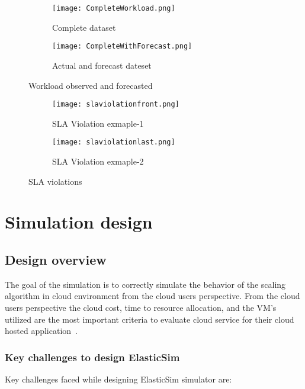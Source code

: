 \begin{figure}
     \centering
     \begin{subfigure}[b]{0.7\textwidth}
         \texttt{[image: CompleteWorkload.png]}
         \caption{Complete dataset}
         \label{figure:sampleworkload}
     \end{subfigure}
     \begin{subfigure}[b]{0.7\textwidth}
         \texttt{[image: CompleteWithForecast.png]}
         \caption{Actual and forecast dateset}
         \label{figure:forecasted}
     \end{subfigure}
     \caption{Workload observed and forecasted}
     \label{fig:workloads}
 \end{figure}
 \begin{figure}
      \centering
     \begin{subfigure}[b]{0.6\textwidth}
         \texttt{[image: slaviolationfront.png]}
         \caption{SLA Violation exmaple-1}
         \label{figure:slavioa}
     \end{subfigure}
     \begin{subfigure}[b]{0.6\textwidth}
         \texttt{[image: slaviolationlast.png]}
         \caption{SLA Violation exmaple-2}
         \label{figure:slaviob}
     \end{subfigure}
     \caption{SLA violations}
     \label{fig:slaviolationfig}
  \end{figure}


 \section{Simulation design}
 \label{sec:Simulation design}

 \subsection{Design overview}
 \label{sub:Design overview}
 The goal of the simulation is to correctly simulate the behavior of the scaling algorithm in cloud environment from the cloud users perspective. From the cloud users perspective the cloud cost, time to resource allocation, and the VM's utilized are the most important criteria to evaluate cloud service for their cloud hosted application~\cite{kim2015pics}.

 \subsubsection{Key challenges to design ElasticSim}
 \label{subs:Key challenges to design ElasticSim}
 Key challenges faced while designing ElasticSim simulator are:

